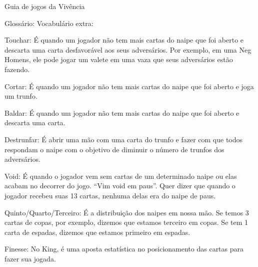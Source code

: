 \begin{secao}{Guia de jogos da Vivência }
\begin{subsecao}{Glossário:}
Vocabulário extra:

Touchar: É quando um jogador não tem mais cartas do naipe que foi aberto e descarta uma carta desfavorável aos seus adversários. Por exemplo, em uma Neg Homens, ele pode jogar um valete em uma vaza que seus adversários estão fazendo.

Cortar:  É quando um jogador não tem mais cartas do naipe que foi aberto e joga um trunfo.

Baldar: É quando um jogador não tem mais cartas do naipe que foi aberto e descarta uma carta.

Destrunfar: É abrir uma mão com uma carta do trunfo e fazer com que todos respondam o naipe com o objetivo de diminuir o número de trunfos dos adversários.

Void: É quando o jogador vem sem cartas de um determinado naipe ou elas acabam no decorrer do jogo. “Vim void em paus”. Quer dizer que quando o jogador recebeu suas 13 cartas, nenhuma delas era do naipe de paus.

Quinto/Quarto/Terceiro: É a distribuição dos naipes em nossa mão. Se temos 3 cartas de copas, por exemplo, dizemos que estamos terceiro em copas. Se tem 1 carta de espadas, dizemos que estamos primeiro em espadas.

Finesse: No King, é uma aposta estatística no posicionamento das cartas para fazer sua jogada.


\end{subsecao}

\end{secao}
